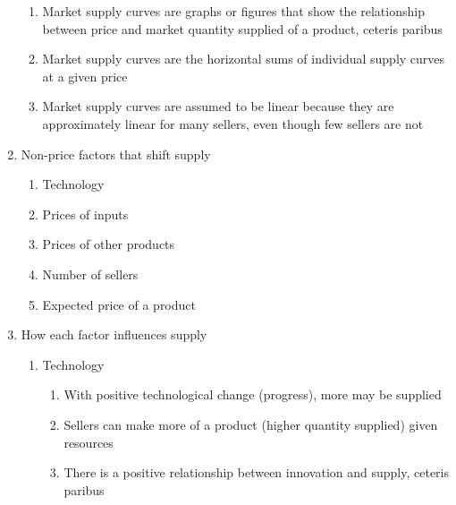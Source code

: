 \documentclass[12pt]{article}
\begin{document}
\begin{enumerate}
\begin{enumerate}
          \item Market supply curves are graphs or figures that show the relationship between price and market quantity supplied of a product, ceteris paribus

          \item Market supply curves are the horizontal sums of individual supply curves at a given price

          \item Market supply curves are assumed to be linear because they are approximately linear for many sellers, even though few sellers are not

        \end{enumerate}

      \item Non-price factors that shift supply

        \begin{enumerate}

          \item Technology

          \item Prices of inputs

          \item Prices of other products

          \item Number of sellers

          \item Expected price of a product

        \end{enumerate}

      \item How each factor influences supply

        \begin{enumerate}

          \item Technology

            \begin{enumerate}

              \item With positive technological change (progress), more may be supplied

              \item Sellers can make more of a product (higher quantity supplied) given resources

              \item There is a positive relationship between innovation and supply, ceteris paribus


\end{enumerate}
\end{enumerate}
\end{enumerate}
\end{document}

